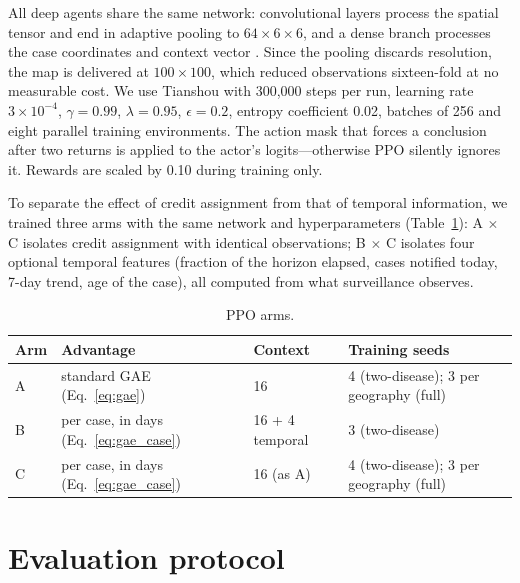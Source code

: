 \documentclass[11pt,a4paper]{article}
\begin{document}
All deep agents share the same network: convolutional layers process the spatial tensor and end in adaptive pooling to $64 \times 6 \times 6$, and a dense branch processes the case coordinates and context vector \cite{frommeyer_reinforcement_2025}. Since the pooling discards resolution, the map is delivered at $100 \times 100$, which reduced observations sixteen-fold at no measurable cost. We use Tianshou \cite{weng2021tianshou} with 300{,}000 steps per run, learning rate $3\times10^{-4}$, $\gamma = 0.99$, $\lambda = 0.95$, $\epsilon = 0.2$, entropy coefficient 0.02, batches of 256 and eight parallel training environments. The action mask that forces a conclusion after two returns is applied to the actor's logits---otherwise PPO silently ignores it. Rewards are scaled by 0.10 during training only.

To separate the effect of credit assignment from that of temporal information, we trained three arms with the same network and hyperparameters (Table~\ref{tab:arms}): A $\times$ C isolates credit assignment with identical observations; B $\times$ C isolates four optional temporal features (fraction of the horizon elapsed, cases notified today, 7-day trend, age of the case), all computed from what surveillance observes.

\begin{table}[htbp]
\centering
\begin{tabular}{llll}
\toprule
\textbf{Arm} & \textbf{Advantage} & \textbf{Context} & \textbf{Training seeds} \\ \midrule
A & standard GAE (Eq.~\ref{eq:gae}) & 16 & 4 (two-disease); 3 per geography (full) \\
B & per case, in days (Eq.~\ref{eq:gae_case}) & 16 + 4 temporal & 3 (two-disease) \\
C & per case, in days (Eq.~\ref{eq:gae_case}) & 16 (as A) & 4 (two-disease); 3 per geography (full) \\ \bottomrule
\end{tabular}
\caption{PPO arms.}
\label{tab:arms}
\end{table}

\section{Evaluation protocol}
\label{sec:protocol}
\end{document}
